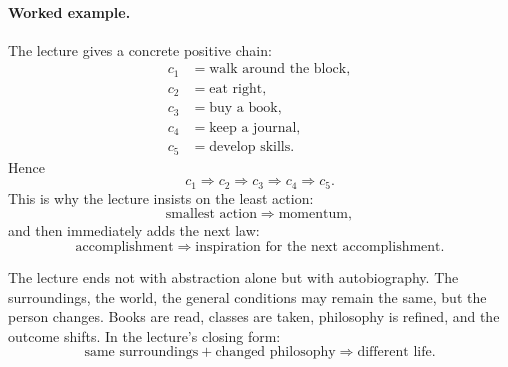 \begin{figure}
\centering
{}
\end{figure}

\paragraph{Worked example.} The lecture gives a concrete positive chain:
\begin{align}
c_1 &= \text{walk around the block},\\
c_2 &= \text{eat right},\\
c_3 &= \text{buy a book},\\
c_4 &= \text{keep a journal},\\
c_5 &= \text{develop skills}.
\end{align}
Hence
\begin{equation}
c_1 \Rightarrow c_2 \Rightarrow c_3 \Rightarrow c_4 \Rightarrow c_5.
\end{equation}
This is why the lecture insists on the least action:
\begin{equation}
\text{smallest action} \Rightarrow \text{momentum},
\end{equation}
and then immediately adds the next law:
\begin{equation}
\text{accomplishment} \Rightarrow \text{inspiration for the next accomplishment}.
\end{equation}

The lecture ends not with abstraction alone but with autobiography. The surroundings, the world, the general conditions may remain the same, but the person changes. Books are read, classes are taken, philosophy is refined, and the outcome shifts. In the lecture's closing form:
\begin{equation}
\text{same surroundings}+\text{changed philosophy}\Rightarrow \text{different life}.
\end{equation}

